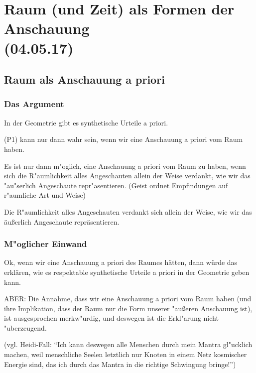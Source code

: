 \documentclass[emulatestandardclasses]{scrartcl}
\begin{document}
\section{Raum (und Zeit) als Formen der Anschauung\\(04.05.17)}

\subsection{Raum als Anschauung a priori}

\subsubsection{Das Argument}

\begin{description}[leftmargin=!,labelwidth=\widthof{\bfseries P2}]
  \item[P1] In der Geometrie gibt es synthetische Urteile a priori.
  \item[P2] (P1) kann nur dann wahr sein, wenn wir eine Anschauung a priori vom Raum haben.
  \item[P3] Es ist nur dann m"oglich, eine Anschauung a priori vom Raum zu haben, wenn sich die R"aumlichkeit alles Angeschauten allein der Weise verdankt, wie wir das "au"serlich Angeschaute repr"asentieren. (Geist ordnet Empfindungen auf r"aumliche Art und Weise)
  \item[K] Die R"aumlichkeit alles Angeschauten verdankt sich allein der Weise, wie wir das äußerlich Angeschaute repräsentieren.
\end{description}

\subsubsection{M"oglicher Einwand}

Ok, wenn wir eine Anschauung a priori des Raumes hätten, dann würde das erklären, wie es respektable synthetische Urteile a priori in der Geometrie geben kann.

ABER: Die Annahme, dass wir eine Anschauung a priori vom Raum haben (und ihre Implikation, dass der Raum nur die Form unserer "außeren Anschauung ist), ist ausgesprochen merkw"urdig, und deswegen ist die Erkl"arung nicht "uberzeugend.

(vgl. Heidi-Fall: "`Ich kann deswegen alle Menschen durch mein Mantra gl"ucklich machen, weil menschliche Seelen letztlich nur Knoten in einem Netz kosmischer Energie sind, das ich durch das Mantra in die richtige Schwingung bringe!"')
\end{document}
